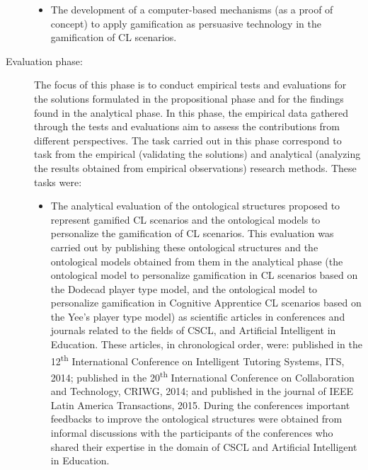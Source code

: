 \begin{description}
\begin{itemize}
\item
The development of a computer-based mechanisms (as a proof of concept) to apply gamification as persuasive technology in the gamification of CL scenarios. 
\end{itemize}


\item[Evaluation phase:]
The focus of this phase is to conduct empirical tests and evaluations for the solutions formulated in the propositional phase and for the findings found in the analytical phase. In this phase, the empirical data gathered through the tests and evaluations aim to assess the contributions from different perspectives. The task carried out in this phase correspond to task from the empirical (validating the solutions) and analytical (analyzing the results obtained from empirical observations) research methods. These tasks were:

\begin{itemize}
\item
The analytical evaluation of the ontological structures proposed to represent gamified CL scenarios and the ontological models to personalize the gamification of CL scenarios. This evaluation was carried out by publishing these ontological structures and the ontological models obtained from them in the analytical phase (the ontological model to personalize gamification in CL scenarios based on the Dodecad player type model, and the ontological model to personalize gamification in Cognitive Apprentice CL scenarios based on the Yee's player type model) as scientific articles in conferences and journals related to the fields of CSCL, and Artificial Intelligent in Education. These articles, in chronological order, were:  published in the 12\textsuperscript{th} International Conference on Intelligent Tutoring Systems, ITS, 2014;  published in the 20\textsuperscript{th} International Conference on Collaboration and Technology, CRIWG, 2014; and  published in the journal of IEEE Latin America Transactions, 2015. During the conferences important feedbacks to improve the ontological structures were obtained from informal discussions with the participants of the conferences who shared their expertise in the domain of CSCL and Artificial Intelligent in Education.


\end{itemize}
\end{description}
